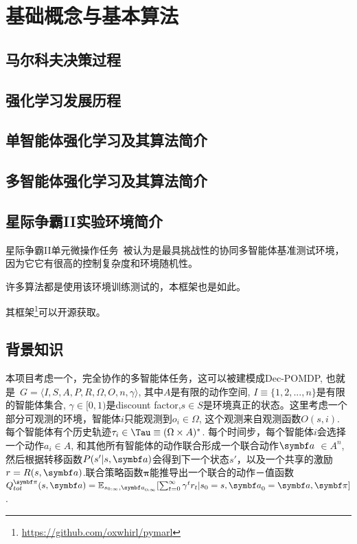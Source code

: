 
\chapter{基础概念与基本算法}
\section{马尔科夫决策过程}

\section{强化学习发展历程}

\section{单智能体强化学习及其算法简介}

\section{多智能体强化学习及其算法简介}

\section{星际争霸II实验环境简介}
星际争霸II单元微操作任务~\cite{samvelyan2019starcraft}被认为是最具挑战性的协同多智能体基准测试环境，因为它它有很高的控制复杂度和环境随机性。

许多算法\cite{foerster2017stabilising, foerster2018counterfactual, rashid2018qmix, mahajan2019maven}都是使用该环境训练测试的，本框架也是如此。

其框架\footnote{\url{https://github.com/oxwhirl/pymarl}}可以开源获取。

\section{背景知识}
本项目考虑一个，完全协作的多智能体任务，这可以被建模成Dec-POMDP, 也就是~\cite{oliehoek2016concise}$G=\langle I, S, A, P, R, \Omega, O, n, \gamma\rangle$, 其中$A$是有限的动作空间, $I\equiv\{1,2,...,n\}$是有限的智能体集合, $\gamma\in[0, 1)$是discount factor,$s\in S$是环境真正的状态。这里考虑一个部分可观测的环境，智能体$i$只能观测到$o_i\in \Omega$, 这个观测来自观测函数$O(s, i)$. 每个智能体有个历史轨迹$\tau_i\in \Tau\equiv(\Omega\times A)^*$. 每个时间步，每个智能体$i$会选择一个动作$a_i\in A$, 和其他所有智能体的动作联合形成一个联合动作$\va$ $\in A^n$,然后根据转移函数$P(s'|s, \va)$会得到下一个状态$s'$，以及一个共享的激励$r=R(s,\va)$.联合策略函数$\bm{\pi}$能推导出一个联合的动作－值函数$Q_{tot}^{\bm{\pi}}(s,\va)=\mathbb{E}_{s_{0:\infty},\va_{0:\infty}}[\sum_{t=0}^\infty \gamma^{t}r_t|s_0=s,\va_0=\va,\bm{\pi}]$. 

